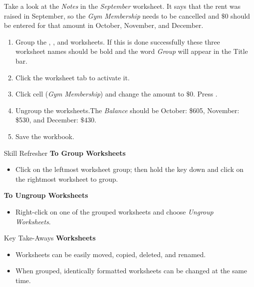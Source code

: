 Take a look at the \textit{Notes} in the \textit{September} worksheet. It says that the rent was raised in September, so the \textit{Gym Membership} needs to be cancelled and $ \$0 $ should be entered for that amount in October, November, and December.

\begin{enumerate}
	\item Group the , , and  worksheets. If this is done successfully these three worksheet names should be bold and the word \textit{Group} will appear in the Title bar.
	\item Click the  worksheet tab to activate it.
	\item Click cell  (\textit{Gym Membership}) and change the amount to $ \$0 $. Press .
	\item Ungroup the worksheets.The \textit{Balance} should be October: \$605, November: \$530, and December: $ \$430 $.
	\item Save the workbook.
\end{enumerate}

\begin{center}
	\begin{sklbox}{Skill Refresher}
		\textbf{To Group Worksheets}
		\\
		\begin{itemize}
			\setlength{\itemsep}{0pt}
			\setlength{\parskip}{0pt}
			\setlength{\parsep}{0pt}
			
			\item Click on the leftmost worksheet group; then hold the  key down and click on the rightmost worksheet to group.
		\end{itemize}
			
		\bigskip
			
		\textbf{To Ungroup Worksheets}
		\begin{itemize}
			\setlength{\itemsep}{0pt}
			\setlength{\parskip}{0pt}
			\setlength{\parsep}{0pt}
			
			\item Right-click on one of the grouped worksheets and choose \textit{Ungroup Worksheets}.
		\end{itemize}
	\end{sklbox}
\end{center}

\begin{center}
	\begin{tkwbox}{Key Take-Aways}
		\textbf{Worksheets}
		\\
		\begin{itemize}
			\setlength{\itemsep}{0pt}
			\setlength{\parskip}{0pt}
			\setlength{\parsep}{0pt}
			
			\item Worksheets can be easily moved, copied, deleted, and renamed.
			\item When grouped, identically formatted worksheets can be changed at the same time.
			
		\end{itemize}
	\end{tkwbox}
\end{center}

